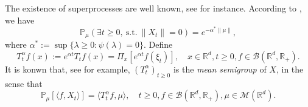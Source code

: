 \documentclass[12pt]{amsart}
\theoremstyle{plain}
\theoremstyle{definition}
\numberwithin{equation}{section}
\begin{document}
	The existence of superprocesses are well known, see \cite{EB} for instance.
    According to \cite[Theorem 12.5 \& Theorem 12.7]{Kyprianou2014Fluctuations}, we have
\begin{equation}
    \mathbb{P}_{\mu} (\exists t\geq 0,~\text{s.t.}~\|X_t\|=0)
    = e^{-\alpha^* \|\mu\|},
\end{equation}
    where $\alpha^* := \sup\{\lambda \geq 0: \psi(\lambda) = 0\}$.
    Define 
\begin{equation}\label{meansemigroup}
    T^{\alpha}_t f(x)
    :=
    e^{\alpha t} T_t f(x) =
    \Pi_x [e^{\alpha t}f(\xi_t)],
    \quad x\in \mathbb{R}^d,t\geq 0, f\in \mathcal B(\mathbb R^d, \mathbb R_+).
\end{equation}
    It is konwn that, see \cite[Proposition 2.27]{Li2011Measure-valued} for example, $(T^\alpha_t)_{t\geq 0}$ is the \emph{mean semigroup} of $X$, in the sense that
\begin{equation}\label{eq:meanformula}
    \mathbb{P}_{\mu}[\langle f, X_t \rangle]
    = \langle T_t^\alpha f, \mu \rangle,
    \quad t\geq 0, f\in \mathcal B(\mathbb R^d, \mathbb R_+), \mu \in \mathcal M(\mathbb R^d).
\end{equation}
\end{document}
